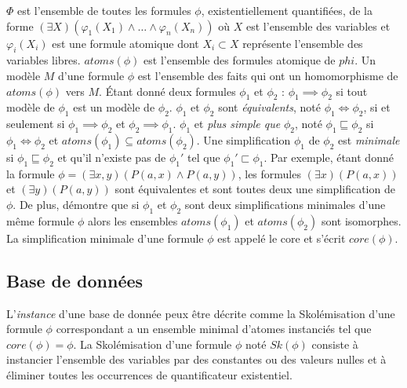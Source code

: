 $\Phi$ est l'ensemble de toutes les formules $\phi$, existentiellement quantifiées, de la forme $(\exists X)(\varphi_1(X_1) \land \dots \land \varphi_n(X_n))$ où $X$ est l'ensemble des variables et $\varphi_i(X_i)$ est une formule atomique dont $X_i \subset X$ représente l'ensemble des variables libres.
$atoms(\phi)$ est l'ensemble des formules atomique de $phi$.
Un modèle $M$ d'une formule $\phi$ est l'ensemble des faits qui ont un homomorphisme de $atoms(\phi)$ vers $M$.
Étant donné deux formules $\phi_1$ et $\phi_2$ : $\phi_1 \implies \phi_2$ si tout modèle de $\phi_1$ est un modèle de $\phi_2$.
$\phi_1$ et $\phi_2$ sont \textit{équivalents}, noté $\phi_1 \iff \phi_2$, si et seulement si $\phi_1 \implies \phi_2$ et $\phi_2 \implies \phi_1$.
$\phi_1$ et \textit{plus simple que} $\phi_2$, noté $\phi_1 \sqsubseteq \phi_2$ si $\phi_1 \iff \phi_2$ et $atoms(\phi_1) \subseteq atoms(\phi_2)$.
Une simplification $\phi_1$ de $\phi_2$ est \textit{minimale} si $\phi_1 \sqsubseteq \phi_2$ et qu'il n'existe pas de $\phi_1'$ tel que $\phi_1' \sqsubset \phi_1$.
Par exemple, étant donné la formule $\phi = (\exists x, y)(P(a, x) \land P(a, y))$, les formules $(\exists x)(P(a, x))$ et $(\exists y)(P(a, y))$ sont équivalentes et sont toutes deux une simplification de $\phi$.
De plus, \cite{chabinConsistentUpdatingDatabases2020} démontre que si $\phi_1$ et $\phi_2$ sont deux simplifications minimales d'une même formule $\phi$ alors les ensembles $atoms(\phi_1)$ et $atoms(\phi_2)$ sont isomorphes.
La simplification minimale d'une formule $\phi$ est appelé le core et s'écrit $core(\phi)$.

\subsection{Base de données}

L'\textit{instance} d'une base de donnée peux être décrite comme la Skolémisation d'une formule $\phi$ correspondant a un ensemble minimal d'atomes instanciés tel que $core(\phi) = \phi$.
La Skolémisation d'une formule $\phi$ noté $Sk(\phi)$ consiste à instancier l'ensemble des variables par des constantes ou des valeurs nulles et à éliminer toutes les occurrences de quantificateur existentiel.

